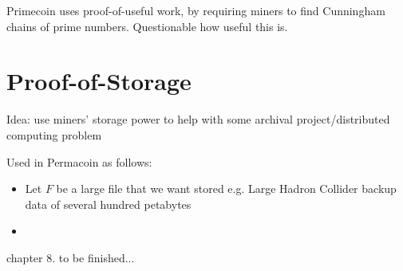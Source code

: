\documentclass{article}
\begin{document}
Primecoin uses proof-of-useful work, by requiring miners to find Cunningham chains of prime numbers. Questionable how useful this is.

\section{Proof-of-Storage}
Idea: use miners' storage power to help with some archival project/distributed computing problem

Used in Permacoin as follows:

\begin{itemize}
\item Let $F$ be a large file that we want stored e.g. Large Hadron Collider backup data of several hundred petabytes
\item 
\end{itemize}

chapter 8. to be finished...
\end{document}
